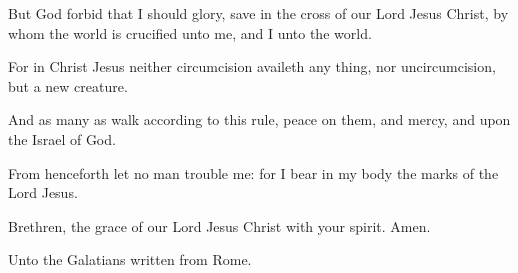 {But God forbid
that
I should
glory,
save
in the
cross of
our
Lord
Jesus
Christ,
by
whom the
world is
crucified unto
me, and
I unto the
world.

For
in
Christ
Jesus
neither
circumcision
availeth any
thing,
nor
uncircumcision,
but a
new
creature.

And as many
as
walk according to
this
rule,
peace
{}
on
them,
and
mercy,
and
upon the
Israel of
God.

From
henceforth
let no
man
trouble
me:
for
I
bear
in
my
body the
marks of the
Lord
Jesus.

Brethren, the
grace of
our
Lord
Jesus
Christ
{}
with
your
spirit.
Amen.


\par }{\SH Unto the Galatians written from Rome.
\par }
